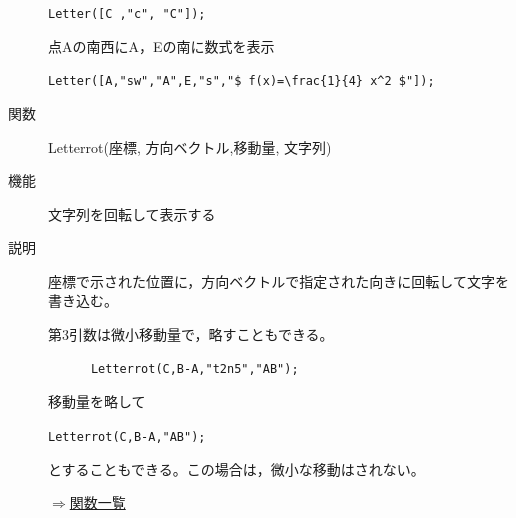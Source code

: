 \documentclass[papersize,a4paper,12pt,uplatex]{jsarticle}
\begin{document}
\begin{description}
\hspace{10mm}  \verb|Letter([C ,"c", "C"]);|

点Aの南西にA，Eの南に数式を表示

\hspace{10mm}  \verb|Letter([A,"sw","A",E,"s","$ f(x)=\frac{1}{4} x^2 $"]);| 

\vspace{\baselineskip}
\hypertarget{letterrot}{}\item[関数]  Letterrot(座標, 方向ベクトル,移動量, 文字列)
\item[機能]  文字列を回転して表示する
\item[説明]  座標で示された位置に，方向ベクトルで指定された向きに回転して文字を書き込む。

第3引数は微小移動量で，略すこともできる。

\begin{verbatim}
      Letterrot(C,B-A,"t2n5","AB");
\end{verbatim}

移動量を略して

\hspace{10mm}  \verb|Letterrot(C,B-A,"AB");|

とすることもできる。この場合は，微小な移動はされない。

\begin{flushright}  \hyperlink{functionlist}{$\Rightarrow$関数一覧}\end{flushright}

\newpage
\end{description}
\end{document}
